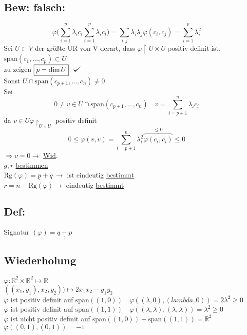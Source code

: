 \documentclass[titlepage,12pt,a4paper,ngerman]{report}
\def\checkmark{\tikz\fill[scale=0.4](0,.35) -- (.25,0) -- (1,.7) -- (.25,.15) -- cycle;}
\newcommand{\tx}[1]{\textrm{#1}}
\newcommand{\ob}[1]{\overbrace{#1}}
\newcommand{\spa}{\tx{span}}
\begin{document}
\subsection{Bew: falsch:}
$$\varphi\bigg( \sum_{i=1}^{p} \lambda_i c_i \sum_{i=1}^{p} \lambda_i c_i\bigg) = \sum_{i,j} \lambda_i \lambda_j \varphi(c_i,c_j) = \sum_{i=1}^{p} \lambda_i^2$$
Sei $ U\subset V $ der größte UR von V derart, dass $ \varphi \upharpoonright U \times U $ positiv definit ist.\\
$ \spa(c_1,\dots,c_p) \subset U $\\
zu zeigen $ \boxed{p = \dim U} \ \ \checkmark$ \\
Sonst $ U \cap \spa (c_{p+1}, \dots , c_n) \neq 0  $\\
Sei $$ 0 \neq  v \in U \cap \spa (c_{p+1},\dots , c_n) \quad v = \sum_{i=p+1}^{n} \lambda_i c_i$$
da $ v \in U \varphi\upharpoonright _{U\times U} $ positiv definit
$$ 0 \le \varphi(v,v) = \sum_{i=p+1}^{n} \lambda_i^2 \ob{\varphi(c_i,c_i)}^{\le 0} \le 0$$
$ \Rightarrow v = 0 \rightarrow $ \underline{Wid}.\\
$ g,r $ \underline{bestimmen}\\
$ \tx{Rg}(\varphi) = \underline{p} + q  \ \rightarrow $ ist eindeutig \underline{bestimmt}\\
$ r = n - \tx{Rg}(\varphi) \rightarrow $ eindeutig \underline{bestimmt}

\subsection{Def:}
Signatur $ (\varphi) = \underline{\underline{q-p}} $



\subsection{Wiederholung}
$ \varphi: \mathbb{R}^2 \times \mathbb{R}^2 \mapsto \mathbb{R} $\\
$ ((x_1,y_1), x_2,y_2) ) \mapsto 2 x_1x_2 - y_1 y_2 $\\
$ \varphi $ ist positiv definit auf $ \spa ((1,0)) \quad \varphi((\lambda,0),(lambda,0)) = 2 \lambda^2 \ge 0$\\
$ \varphi $ ist positiv definit auf $ \spa((1,1)) \quad \varphi((\lambda,\lambda),(\lambda,\lambda)) = \lambda^2 \ge 0 $\\
$ \varphi $ ist nicht positiv definit auf $ \spa((1,0)) + \spa((1,1)) = \mathbb{R}^2$\\
$\varphi((0,1),(0,1)) = -1 $
\end{document}
